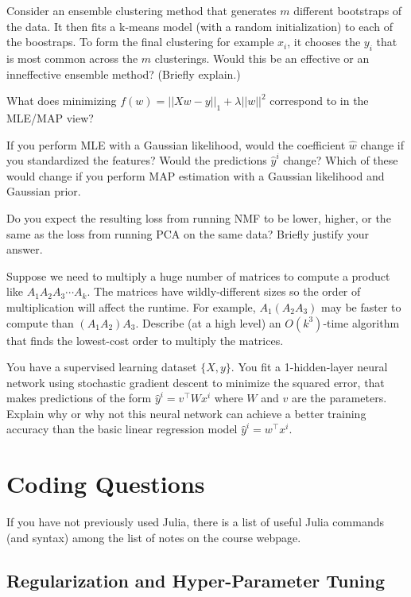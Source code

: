 \documentclass{article}
\begin{document}
{{\item Consider an ensemble clustering method that generates $m$ different bootstraps of the data. It then fits a k-means model (with a random initialization) to each of the boostraps. To form the final clustering for example $x_i$, it chooses the $y_i$ that is most common across the $m$ clusterings. Would this be an effective or an inneffective ensemble method? (Briefly explain.)
\item What does minimizing $f(w)=||Xw-y||_1+\lambda ||w||^2$ correspond to in the MLE/MAP view?
\item If you perform MLE with a Gaussian likelihood, would the coefficient $\hat{w}$ change if you standardized the features? Would the predictions $\hat{y}^i$ change? Which of these would change if you perform MAP estimation with a Gaussian likelihood and Gaussian prior.
\item Do you expect the resulting loss from running NMF
to be lower, higher, or the same as the loss from running PCA on the same data?
Briefly justify your answer.
\item Suppose we need to multiply a huge number of matrices to compute a product like $A_1 A_2A_3 \cdots A_k$. The matrices have wildly-different sizes so the order of multiplication will affect the runtime. For example, $A_1(A_2A_3)$ may be faster to compute than $(A_1A_2)A_3$. Describe (at a high level) an $O(k^3)$-time algorithm that finds the lowest-cost order to multiply the matrices.
\item You have a supervised learning dataset $\{X,y\}$. You fit a 1-hidden-layer neural network using stochastic gradient descent to minimize the squared error, that makes predictions of the form $\hat{y}^i = v^\top Wx^i$ where $W$ and $v$ are the parameters. Explain why or why not this neural network can achieve a better training accuracy than the basic linear regression model $\hat{y}^i = w^\top x^i$.
}
}


\section{Coding Questions}



If you have not previously used Julia, there is a list of useful Julia commands (and syntax) among the list of notes on the course webpage.

\subsection{Regularization and Hyper-Parameter Tuning}
\end{document}
